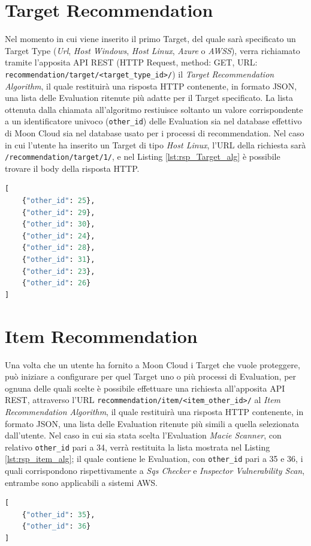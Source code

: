 \section*{Target Recommendation}
Nel momento in cui viene inserito il primo Target, del quale sarà specificato un Target Type (\textit{Url}, \textit{Host Windows}, 
\textit{Host Linux}, \textit{Azure} o \textit{AWSS}), verra richiamato tramite l'apposita API REST (HTTP Request, method: GET, URL: 
\texttt{recommendation/target/<target\_type\_id>/}) il \textit{Target Recommendation Algorithm}, il quale restituirà una 
risposta HTTP contenente, in formato JSON, una lista delle Evaluation ritenute più adatte per il Target specificato. 
La lista ottenuta dalla chiamata all'algoritmo restiuisce soltanto un valore corrispondente a un 
identificatore univoco (\texttt{other\_id}) delle Evaluation sia nel database effettivo di Moon Cloud sia nel database usato 
per i processi di recommendation. Nel caso in cui l'utente ha inserito un Target di tipo \textit{Host Linux}, l'URL della 
richiesta sarà \texttt{/recommendation/target/1/}, e nel Listing \ref{lst:rsp_Target_alg} è possibile trovare il body 
della risposta HTTP.
\lstset{style=python_code_style}
\begin{lstlisting}[language=Python, label=lst:rsp_Target_alg, caption={Esempio del body della risposta HTTP alla chiamata del 
    \textit{Target Recommendation Algorithm}}]
[
    {"other_id": 25},
    {"other_id": 29},
    {"other_id": 30},
    {"other_id": 24},
    {"other_id": 28},
    {"other_id": 31},
    {"other_id": 23},
    {"other_id": 26}
]
\end{lstlisting}
%
\section*{Item Recommendation}
Una volta che un utente ha fornito a Moon Cloud i Target che vuole proteggere, può iniziare a configurare per quel Target uno 
o più processi di Evaluation, per ognuna delle quali scelte è possibile effettuare una richiesta all'apposita API REST, 
attraverso l'URL \texttt{recommendation/item/<item\_other\_id>/} al \textit{Item Recommendation Algorithm}, il quale 
restituirà una risposta HTTP contenente, in formato JSON, una lista delle Evaluation ritenute più simili a quella selezionata 
dall'utente. Nel caso in cui sia stata scelta l'Evaluation \textit{Macie Scanner}, con relativo \texttt{other\_id} pari a 34, 
verrà restituita la lista mostrata nel Listing \ref{lst:rsp_item_alg}; il quale 
contiene le Evaluation, con \texttt{other\_id} pari a 35 e 36, i quali corrispondono rispettivamente a \textit{Sqs Checker} 
e \textit{Inspector Vulnerability Scan}, entrambe sono applicabili a sistemi AWS.
\begin{lstlisting}[language=Python, label=lst:rsp_item_alg, caption={Esempio del body della risposta HTTP alla chiamata del 
    \textit{Item Recommendation Algorithm}}]
[
    {"other_id": 35},
    {"other_id": 36}
]
\end{lstlisting}
%

